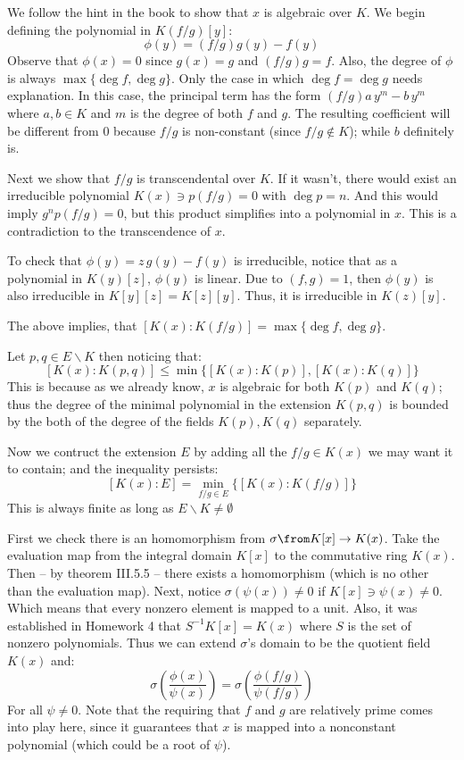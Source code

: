 We follow the hint in the book to show that $x$ is algebraic over $K$. 
We begin defining the polynomial in $K(f/g)[y]$:
$$\phi(y) = (f/g)g(y) - f(y)$$
Observe that $\phi(x) =0$ since $g(x)=g$ and $(f/g)g=f$. 
Also, the degree of $\phi$ is always $\max\{ \deg f, \deg g\}$. 
Only the case in which $\deg f= \deg g$ needs explanation. 
In this case, the principal term has the form $(f/g) a\, y^m - b\, y^m$ where $a,b\in K$ and $m$ is the degree of both $f$ and $g$.
The resulting coefficient will be different from 0 because $f/g$ is non-constant (since $f/g\notin K$); while $b$ definitely is.

Next we show that $f/g$ is transcendental over $K$.
If it wasn't, there would exist an irreducible polynomial $K(x) \ni p(f/g)=0$ with $\deg p = n$.
And this would imply $g^np(f/g)=0$, but this product simplifies into a polynomial in $x$.
This is a contradiction to the transcendence of $x$.

To check that $\phi(y)=z\,g(y)-f(y)$ is irreducible, notice that as a polynomial in $K(y)[z]$, $\phi(y)$ is linear. 
Due to $(f,g)=1$, then $\phi(y)$ is also irreducible in $K[y][z]=K[z][y]$.
Thus, it is irreducible in $K(z)[y]$.

The above implies, that $[K(x):K(f/g)]= \max\{ \deg f, \deg g\}$.

Let $p,q\in E\backslash K$ then noticing that:
$$[K(x):K(p,q)] \leq \min\{ [K(x):K(p)], [K(x):K(q)]\}$$
This is because as we already know,  $x$ is algebraic for both $K(p)$ and $K(q)$; 
thus the degree of the minimal polynomial in the extension $K(p,q)$ is bounded by the both of the degree of the fields $K(p),K(q)$ separately.  

Now we contruct the extension $E$ by adding all the $f/g\in K(x)$ we may want it to contain; and the inequality persists:
$$[K(x):E] = \min_{f/g\in E} \{[K(x):K(f/g)]\}$$
This is always finite as long as $E\backslash K\neq \emptyset$

First we check there is an homomorphism from $\sigma \from K[x]\to K(x)$.
Take the evaluation map from the integral domain $K[x]$ to the commutative ring $K(x)$.
Then -- by theorem III.5.5 -- there exists a homomorphism (which is no other than the evaluation map).
Next, notice $\sigma(\psi(x))\neq 0$ if $K[x]\ni \psi(x) \neq 0$. Which means that every nonzero element is mapped to a unit.
Also, it was established in Homework 4 that $S^{-1}K[x] = K(x)$ where $S$ is the set of nonzero polynomials.
Thus we can extend $\sigma$'s domain to be the quotient field $K(x)$ and:
$$\sigma\left(\frac{\phi(x)}{\psi(x)}\right) = \sigma\left(\frac{\phi(f/g)}{\psi(f/g)}\right)$$
For all $\psi\neq 0$. 
Note that the requiring that $f$ and $g$ are relatively prime comes into play here, since it guarantees that $x$ is mapped into a nonconstant polynomial (which could be a root of $\psi$).
